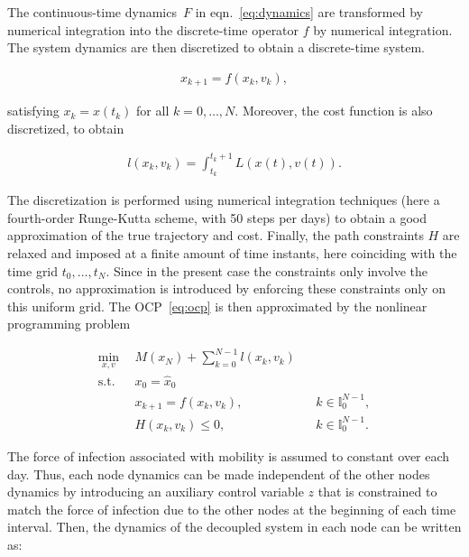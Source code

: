 The continuous-time dynamics~$F$ in eqn.~\eqref{eq:dynamics} are transformed by numerical integration into the discrete-time operator $f$ by numerical integration. The system dynamics are then discretized to obtain a discrete-time system.

\begin{align*}
    x_{k+1} = f(x_k,v_k),
\end{align*}

satisfying $x_k=x(t_k)$ for all $k=0,\ldots,N$. Moreover, the cost function is also discretized, to obtain

\begin{align*}
    l(x_k,v_k)=\int_{t_k}^{t_k+1} L(x(t),v(t)).
\end{align*}

The discretization is performed using numerical integration techniques (here a fourth-order Runge-Kutta scheme, with 50 steps per days) to obtain a good approximation of the true trajectory and cost. Finally, the path constraints $H$ are relaxed and imposed at a finite amount of time instants, here coinciding with the time grid $t_0,\ldots,t_N$. Since in the present case the constraints only involve the controls, no approximation is introduced by enforcing these constraints only on this uniform grid. The OCP~\eqref{eq:ocp} is then approximated by the nonlinear programming problem

\begin{subequations}
    \begin{align}
        \min_{x,v} \ \ & M(x_N)+\sum_{k=0}^{N-1} l(x_k,v_k)  \\ 
        \mathrm{s.t.} \ \ & x_0 = \hat x_0 \\
        & x_{k+1} = f(x_k,v_k), && k\in \mathbb{I}_0^{N-1}, \\
        &H(x_k,v_k)\leq 0, && k\in \mathbb{I}_0^{N-1}.
    \end{align}
        \label{eq:ocp_nlp}
\end{subequations}

The force of infection associated with mobility is assumed to constant over each day. Thus, each node dynamics can be made independent of the other nodes dynamics by introducing an auxiliary control variable $z$ that is constrained to match the force of infection due to the other nodes at the beginning of each time interval. Then, the dynamics of the decoupled system in each node can be written as:

